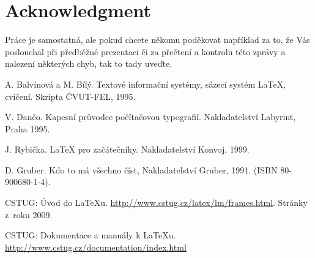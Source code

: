 \documentclass[report,11pt]{elsarticle}
\begin{document}
\section*{\label{SEC:ACK}Acknowledgment}

Práce je samostatná, ale pokud chcete někomu poděkovat například za
to, že Vás poslouchal při předběžné prezentaci či za přečtení a
kontrolu této zprávy a nalezení některých chyb, tak to tady uveďte.


%
%
%

\label{SEC:References}
\renewcommand\bibname{References}
\begin{thebibliography}{10}

A. Balvínová a M. Bílý.
\newblock Textové informační systémy, sázecí systém \LaTeX, cvičení.
Skripta ČVUT-FEL, 1995.

V. Dančo.
\newblock Kapesní průvodce počítačovou typografií. Nakladatelství
Labyrint, Praha 1995.

J. Rybička.
\newblock \LaTeX\/ pro začátečníky. Nakladatelství Konvoj, 1999.

D. Gruber.
\newblock Kdo to má všechno číst, Nakladatelství Gruber, 1991.
(ISBN 80-900680-1-4).

 CSTUG: Úvod do \LaTeX{u}.
\newblock
\url{http://www.cstug.cz/latex/lm/frames.html}. Stránky z~roku 2009.

CSTUG: Dokumentace a manuály k \LaTeX{u}.
\newblock \url{http://www.cstug.cz/documentation/index.html}

\end{thebibliography}
\end{document}
